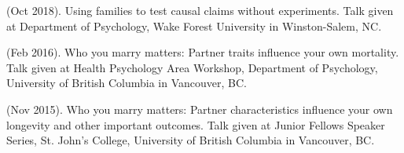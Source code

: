 \begin{etaremune}
%
%
\item\meb (Oct 2018). Using families to test causal claims without experiments. Talk given at Department of Psychology, Wake Forest University in Winston-Salem, NC.
%
\item \meb (Feb 2016). Who you marry matters: Partner traits influence your own mortality. Talk given at Health Psychology Area Workshop, Department of Psychology, University of British Columbia in Vancouver, BC. 
%
\item \meb (Nov 2015). Who you marry matters: Partner characteristics influence your own longevity and other important outcomes. Talk given at Junior Fellows Speaker Series, St. John's College, University of British Columbia in Vancouver, BC. \smallskip
\end{etaremune}%
